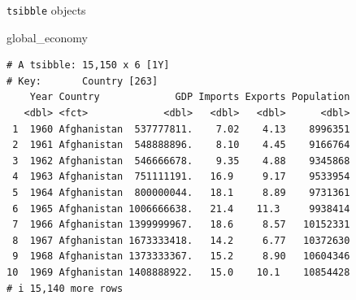 \documentclass[
  14pt,
  ignorenonframetext,
  aspectratio=169,
]{beamer}
\newenvironment{Shaded}{\begin{snugshade}}{\end{snugshade}}
\newcommand{\NormalTok}[1]{#1}
\renewenvironment{Shaded}{\vspace*{0.15cm}\color{black}\fontsize{10}{10}\sf\begin{snugshade}\color{black}}{\end{snugshade}}
\begin{document}
\begin{frame}[fragile]{\texttt{tsibble} objects}
\protect{}\label{tsibble-objects-1}
\fontsize{10}{11.2}\sf

\begin{Shaded}
\begin{Highlighting}[]
\NormalTok{global\_economy}
\end{Highlighting}
\end{Shaded}

\begin{verbatim}
# A tsibble: 15,150 x 6 [1Y]
# Key:       Country [263]
    Year Country             GDP Imports Exports Population
   <dbl> <fct>             <dbl>   <dbl>   <dbl>      <dbl>
 1  1960 Afghanistan  537777811.    7.02    4.13    8996351
 2  1961 Afghanistan  548888896.    8.10    4.45    9166764
 3  1962 Afghanistan  546666678.    9.35    4.88    9345868
 4  1963 Afghanistan  751111191.   16.9     9.17    9533954
 5  1964 Afghanistan  800000044.   18.1     8.89    9731361
 6  1965 Afghanistan 1006666638.   21.4    11.3     9938414
 7  1966 Afghanistan 1399999967.   18.6     8.57   10152331
 8  1967 Afghanistan 1673333418.   14.2     6.77   10372630
 9  1968 Afghanistan 1373333367.   15.2     8.90   10604346
10  1969 Afghanistan 1408888922.   15.0    10.1    10854428
# i 15,140 more rows
\end{verbatim}

\end{frame}
\end{document}
